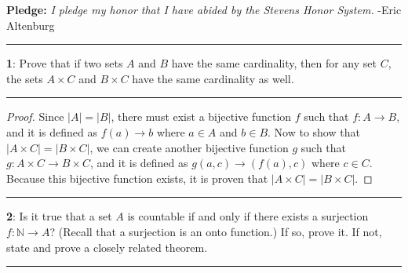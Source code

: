 \documentclass[11pt]{article}
\newcommand\question[2]{\vspace{.25in}\hrule\textbf{#1}: #2\vspace{.5em}\hrule\vspace{.10in}}
\newcommand{\N}{\mathbb{N}}
\begin{document}
\raggedright
\newcommand\NAME{Eric Altenburg}  %
\newcommand\COURSE{MA-240}
\newcommand\HWNUM{7 Corrections}              %


\textbf{Pledge:} \textit{I pledge my honor that I have abided by the Stevens Honor System.} -Eric Altenburg

\question{1}{Prove that if two sets $A$ and $B$ have the same cardinality, then for any set $C$, the sets $A \times C$ and $B \times C$ have the same cardinality as well.}

\begin{proof}
	Since $|A|=|B|$, there must exist a bijective function $f$ such that $f : A \rightarrow B$, and it is defined as $f(a) \rightarrow b$ where $a \in A$ and $b \in B$. Now to show that $|A \times C| = |B \times C|$, we can create another bijective function $g$ such that $g : A \times C \rightarrow B \times C$, and it is defined as $g(a,c) \rightarrow (f(a), c)$ where $c \in C$. Because this bijective function exists, it is proven that $|A \times C| = |B \times C|$.
\end{proof}


\question{2}{Is it true that a set $A$ is countable if and only if there exists a surjection $f : \N \rightarrow A$? (Recall that a surjection is an onto function.) If so, prove it. If not, state and prove a closely related theorem.}
\end{document}
